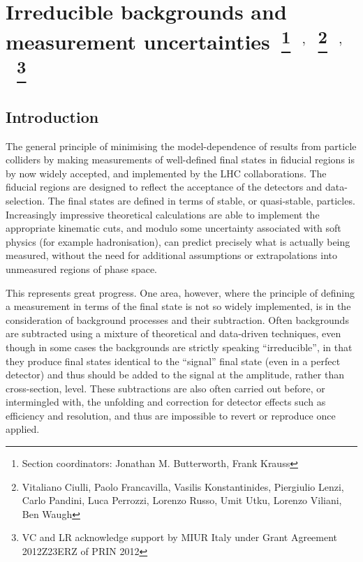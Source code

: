 \documentclass[11pt]{cernrep}
\begin{document}
 
\section{Irreducible backgrounds and measurement uncertainties~\protect\footnote{Section
  coordinators: Jonathan M. Butterworth, Frank Krauss }~$^{,}$~\protect\footnote{Vitaliano Ciulli, Paolo
  Francavilla, Vasilis Konstantinides, Piergiulio Lenzi, Carlo Pandini, Luca Perrozzi, Lorenzo Russo, Umit
  Utku, Lorenzo Viliani, Ben Waugh}~$^{,}$~\protect\footnote{VC and LR
  acknowledge support by MIUR Italy under Grant Agreement 2012Z23ERZ of PRIN 2012}}



\subsection{Introduction}
\label{sec:intro}

The general principle of minimising the model-dependence of results from particle colliders by making measurements of 
well-defined final states in fiducial regions is by now widely accepted, and implemented by the LHC collaborations. 
The fiducial regions are designed to reflect the acceptance of the detectors and data-selection. 
The final states are defined in terms of stable, or quasi-stable,
particles. Increasingly impressive theoretical calculations are able to implement the appropriate kinematic cuts, and
modulo some uncertainty associated with soft physics (for example hadronisation), can predict precisely what 
is actually being measured, without the need for additional assumptions or extrapolations into unmeasured regions of 
phase space.

This represents great progress. One area, however, where the principle of defining a measurement in terms of the final state
is not so widely implemented, is in the consideration of background processes and their subtraction. 
Often backgrounds are subtracted using a mixture of theoretical and data-driven techniques, 
even though in some cases the backgrounds are strictly speaking ``irreducible'', in that they produce final states 
identical to the ``signal'' final state (even in a perfect detector) and thus should be added to the signal 
at the amplitude, rather than cross-section, level. These subtractions are also often carried out before, or intermingled with, 
the unfolding and correction for detector effects such as efficiency and resolution, and thus are 
impossible to revert or reproduce once applied.
\end{document}
